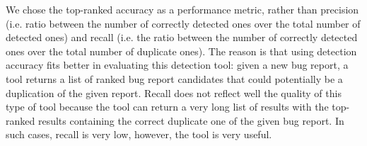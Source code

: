 




We chose the top-ranked accuracy as a performance metric, rather than
precision (i.e. ratio between the number of correctly detected ones
over the total number of detected ones) and recall (i.e. the ratio
between the number of correctly detected ones over the total number of
duplicate ones). The reason is that using detection accuracy fits
better in evaluating this detection tool: given a new bug report, a
tool returns a list of ranked bug report candidates that could
potentially be a duplication of the given report.
Recall does not reflect well the quality of this type of tool because
the tool can return a very long list of results with the top-ranked
results containing the correct duplicate one of the given bug
report. In such cases, recall is very low, however, the tool is very
useful.


